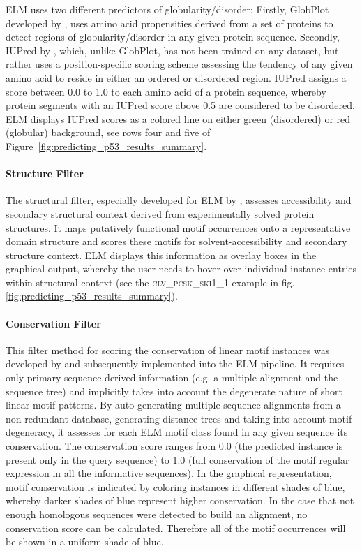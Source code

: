 \documentclass[12pt]{article}
\newcommand\motif[1]{%
    \textsc{\lowercase{#1}}%
}
\begin{document}
	ELM uses two different predictors of globularity/disorder: Firstly, GlobPlot
	developed by \cite{12824398}, uses amino acid propensities derived from a set of
	proteins to detect regions of globularity/disorder in any given protein
	sequence. Secondly, IUPred by \cite{15955779}, which, unlike GlobPlot, has not
	been trained on any dataset, but rather uses a position-specific scoring scheme
	assessing the tendency of any given amino acid to reside in either an ordered
	or disordered region. IUPred assigns a score between 0.0 to 1.0 to each amino
	acid of a protein sequence, whereby protein segments with an IUPred score above
	0.5 are considered to be disordered. ELM displays IUPred scores as a colored
	line on either green (disordered) or red (globular) background, see rows four
	and five of Figure~\ref{fig:predicting_p53_results_summary}.

	\paragraph*{Structure Filter}\label{StructureFilter}

	The structural filter, especially developed for ELM by \cite{19852836},
	assesses accessibility and secondary structural context derived from
	experimentally solved protein structures. It maps putatively functional motif
	occurrences onto a representative domain structure and scores these motifs for
	solvent-accessibility and secondary structure context. ELM displays this
	information as overlay boxes in the graphical output, whereby the user needs to
	hover over individual instance entries within structural context (see the
	\motif{CLV\_PCSK\_SKI1\_1} example in fig.
	\ref{fig:predicting_p53_results_summary}).

	\paragraph*{Conservation Filter}\label{ConservationFilter}

	This filter method for scoring the conservation of linear motif instances was
	developed by \cite{18460207} and subsequently implemented into the ELM
	pipeline. It requires only primary sequence-derived information (e.g. a
	multiple alignment and the sequence tree) and implicitly takes into account the
	degenerate nature of short linear motif patterns. By auto-generating multiple
	sequence alignments from a non-redundant database, generating distance-trees
	and taking into account motif degeneracy, it assesses for each ELM motif class
	found in any given sequence its conservation. The conservation score ranges
	from 0.0 (the predicted instance is present only in the query sequence) to 1.0
	(full conservation of the motif regular expression in all the informative
	sequences).
	In the graphical representation, motif conservation is indicated by coloring
	instances in different shades of blue, whereby darker shades of blue represent
	higher conservation.
	In the case that not enough homologous sequences were detected to build an
	alignment, no conservation score can be calculated. Therefore all of the motif
	occurrences will be shown in a uniform shade of blue.
\end{document}
